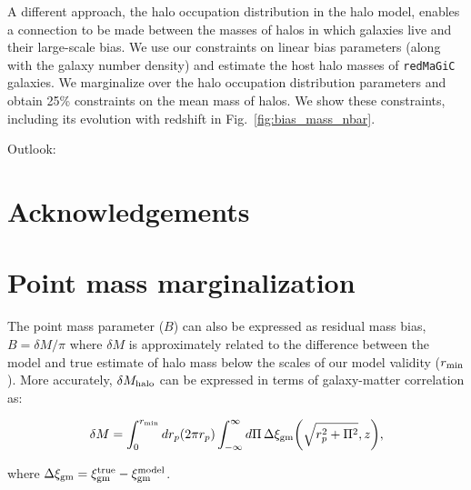 \documentclass[fleqn,usenatbib]{mnras}
\newcommand{\redmagic}{\texttt{redMaGiC} }
\begin{document}
A different approach, the halo occupation distribution in the halo model, enables a connection to be made between the masses of halos in which galaxies live and their large-scale bias. We use our constraints on linear bias parameters (along with the galaxy number density) and estimate the host halo masses of \redmagic galaxies. We marginalize over the halo occupation distribution parameters and obtain 25\% constraints on the mean mass of halos. We show these constraints, including its evolution with redshift in Fig.~\ref{fig:bias_mass_nbar}.

Outlook: 


\section*{Acknowledgements}











\appendix



\section{Point mass marginalization}
\label{app:pm}
The point mass parameter ($B$) can also be expressed as residual mass bias, $B = \delta M/\pi$ where $\delta M$ is approximately related to the difference between the model and true estimate of halo mass below the scales of our model validity ($r_{\rm min}$). More accurately, $\delta M_{\rm halo}$ can be expressed in terms of galaxy-matter correlation as:
\begin{linenomath*}
\begin{equation}
\label{eq:pm_halo}
    \delta M = \int_{0}^{r_{\rm min}} dr_p (2\pi r_p) \int_{-\infty}^{\infty} d\Pi \, \Delta \xi_{\rm gm}\bigg(\sqrt{r_p^2 + \Pi^2}, z \bigg), 
\end{equation}
\end{linenomath*}
where $\Delta \xi_{\rm gm} = \xi^{\rm true}_{\rm gm} - \xi^{\rm model}_{\rm gm}$.
\end{document}

